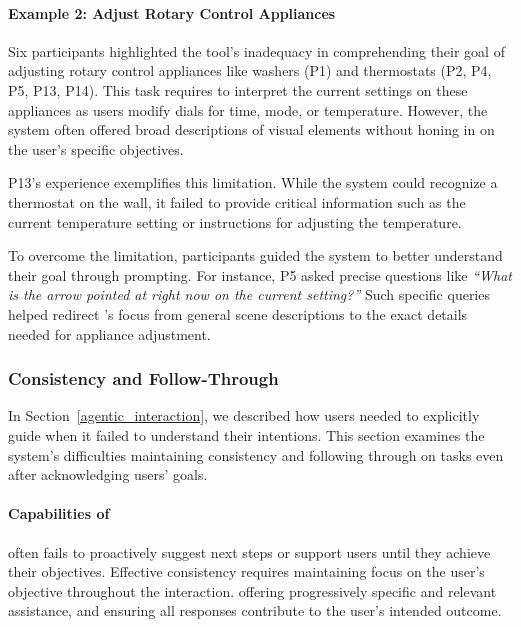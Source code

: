 \paragraph{Example 2: Adjust Rotary Control Appliances}
Six participants highlighted the tool's inadequacy in comprehending their goal of adjusting rotary control appliances like washers (P1) and thermostats (P2, P4, P5, P13, P14). This task requires \bma{} to interpret the current settings on these appliances as users modify dials for time, mode, or temperature.
% 
However, the system often offered broad descriptions of visual elements without honing in on the user's specific objectives. 


P13's experience exemplifies this limitation. While the system could recognize a thermostat on the wall, it failed to provide critical information such as the current temperature setting or instructions for adjusting the temperature. 



To overcome the limitation, participants guided the system to better understand their goal through prompting. 
% 
For instance, P5 asked precise questions like \textit{``What is the arrow pointed at right now on the current setting?''} Such specific queries helped redirect \sbma's focus from general scene descriptions to the exact details needed for appliance adjustment. 





\subsubsection{Consistency and Follow-Through}
\label{consistency}


In Section~\ref{agentic_interaction}, we described how users needed to explicitly guide \bma{} when it failed to understand their intentions. 
% 
This section examines the system's difficulties maintaining consistency and following through on tasks even after acknowledging users' goals. 



\paragraph{Capabilities of \bma}


\sbma{} often fails to proactively suggest next steps or support users until they achieve their objectives. 
% 
Effective consistency requires maintaining focus on the user's objective throughout the interaction.  offering progressively specific and relevant assistance, and ensuring all responses contribute to the user's intended outcome.


